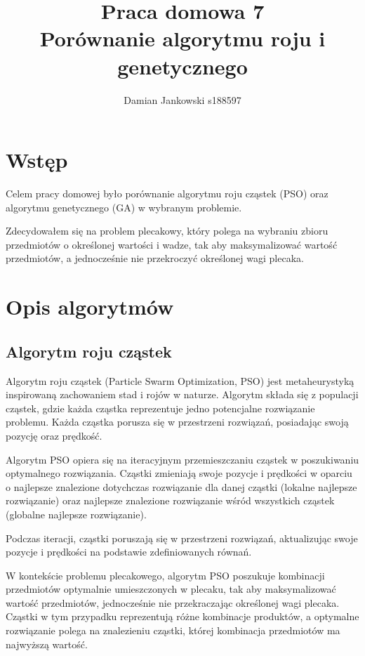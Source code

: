 \documentclass{article}
\title{Praca domowa 7\\Porównanie algorytmu roju i genetycznego}
\author{Damian Jankowski s188597}
\begin{document}
\maketitle

\section{Wstęp}

Celem pracy domowej było porównanie algorytmu roju 
cząstek (PSO) oraz algorytmu genetycznego (GA) w wybranym problemie.

Zdecydowałem się na problem plecakowy, który polega na wybraniu
zbioru przedmiotów o określonej wartości i wadze, tak aby
maksymalizować wartość przedmiotów, a jednocześnie nie przekroczyć
określonej wagi plecaka.

\section{Opis algorytmów}


\subsection{Algorytm roju cząstek}

Algorytm roju cząstek (Particle Swarm Optimization, PSO) 
jest metaheurystyką inspirowaną zachowaniem stad i rojów w naturze. 
Algorytm składa się z populacji cząstek, gdzie każda cząstka reprezentuje 
jedno potencjalne rozwiązanie problemu. Każda cząstka porusza się w 
przestrzeni rozwiązań, posiadając swoją pozycję oraz prędkość.

Algorytm PSO opiera się na iteracyjnym przemieszczaniu cząstek w 
poszukiwaniu optymalnego rozwiązania. Cząstki zmieniają swoje pozycje 
i prędkości w oparciu o najlepsze znalezione dotychczas rozwiązanie dla
danej cząstki (lokalne najlepsze rozwiązanie) oraz najlepsze znalezione 
rozwiązanie wśród wszystkich cząstek (globalne najlepsze rozwiązanie).

Podczas iteracji, cząstki poruszają się w przestrzeni rozwiązań, 
aktualizując swoje pozycje i prędkości na podstawie zdefiniowanych równań.

W kontekście problemu plecakowego, algorytm PSO poszukuje kombinacji przedmiotów 
optymalnie umieszczonych w plecaku, tak aby maksymalizować wartość przedmiotów, 
jednocześnie nie przekraczając określonej wagi plecaka. Cząstki w tym przypadku 
reprezentują różne kombinacje produktów, a optymalne rozwiązanie polega na znalezieniu 
cząstki, której kombinacja przedmiotów ma najwyższą wartość.
\end{document}
